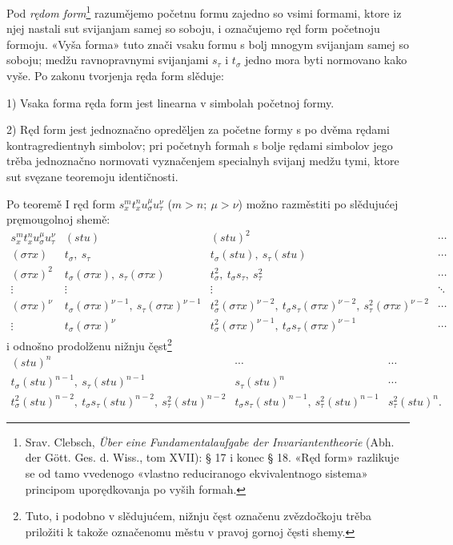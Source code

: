 \documentclass[11pt]{article}
\begin{document}
Pod {\itshape rędom form}\footnote{Srav. Clebsch, \emph{Über eine Fundamentalaufgabe der Invariantentheorie} (Abh. der Gött. Ges. d. Wiss., tom XVII): § 17 i konec § 18. «Ręd form» razlikuje se od tamo vvedenogo «vlastno reduciranogo ekvivalentnogo sistema» principom uporędkovanja po vyših formah.}
razumějemo početnu formu zajedno so vsimi formami, ktore iz njej nastali sut svijanjam samej so soboju, i označujemo ręd form početnoju formoju. «Vyša forma» tuto znači vsaku formu s bolj mnogym svijanjam samej so soboju; medžu ravnopravnymi svijanjami $s_\tau$ i $t_\sigma$ jedno mora byti normovano kako vyše. Po zakonu tvorjenja ręda form slěduje:

1) Vsaka forma ręda form jest linearna v simbolah početnoj formy.

2) Ręd form jest jednoznačno opreděljen za početne formy s po dvěma rędami kontragredientnyh simbolov; pri početnyh formah s bolje rędami simbolov jego trěba jednoznačno normovati vyznačenjem specialnyh svijanj medžu tymi, ktore sut svęzane teoremoju identičnosti.

Po teoremě I ręd form $s_x^m t_x^n u_\sigma^\mu u_\tau^\nu$ ($m>n;\ \mu>\nu$) možno razměstiti po slědujućej pręmougolnoj shemě:
\begingroup\small
\[
\begin{array}{c|c|c|c}
s_x^m t_x^n u_\sigma^\mu u_\tau^\nu
& (stu)
& (stu)^2
& \cdots\\[0.3em]
(\sigma\tau x)
& t_\sigma,\ s_\tau
& t_\sigma(stu),\ s_\tau(stu)
& \cdots\\[0.3em]
(\sigma\tau x)^2
& t_\sigma(\sigma\tau x),\ s_\tau(\sigma\tau x)
& t_\sigma^2,\ t_\sigma s_\tau,\ s_\tau^2
& \cdots\\[0.3em]
\vdots&\vdots&\vdots&\ddots\\[0.3em]
(\sigma\tau x)^\nu
& t_\sigma(\sigma\tau x)^{\nu-1},\ s_\tau(\sigma\tau x)^{\nu-1}
& t_\sigma^2(\sigma\tau x)^{\nu-2},\ t_\sigma s_\tau(\sigma\tau x)^{\nu-2},\ s_\tau^2(\sigma\tau x)^{\nu-2}
& \cdots\\[0.3em]
\vdots
& t_\sigma(\sigma\tau x)^\nu
& t_\sigma^2(\sigma\tau x)^{\nu-1},\ t_\sigma s_\tau(\sigma\tau x)^{\nu-1}
& \cdots
\end{array}
\]
\endgroup
i odnošno prodolženu nižnju čęst\footnote{Tuto, i podobno v slědujućem, nižnju čęst označenu zvězdočkoju trěba priložiti k takože označenomu městu v pravoj gornoj čęsti shemy.}
\begingroup\small
\[
\begin{array}{c|c|c}
(stu)^n & \cdots & \cdots\\[0.3em]
t_\sigma(stu)^{n-1},\ s_\tau(stu)^{n-1}
& s_\tau(stu)^n & \cdots\\[0.3em]
t_\sigma^2(stu)^{n-2},\ t_\sigma s_\tau(stu)^{n-2},\ s_\tau^2(stu)^{n-2}
& t_\sigma s_\tau(stu)^{n-1},\ s_\tau^2(stu)^{n-1}
& s_\tau^2(stu)^n .
\end{array}
\]
\endgroup
\end{document}
